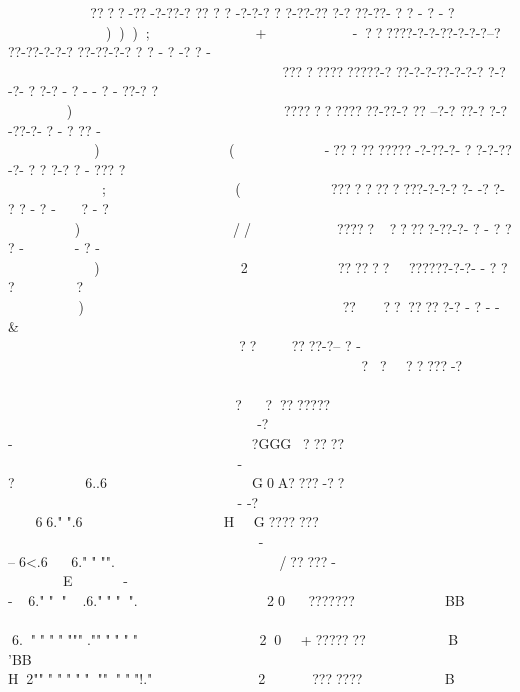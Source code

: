  ????-??-?-??-? ?? ? ? -?-?-? ? ?-??-?? ?-? ??-??-  ?   ? - ? - ?    )));  + -??????-?-?-??-?-?-?--? ??-??-?-?-? ??-??-?-?   ?  ? - ? -? ? -              ?????????????-? ??-?-?-??-?-?-? ?-?-?- ? ?-?  - ? - - ?  -  ??-? ?     )      ????????????-??-? ?? --?-? ??-? ?-?-??-?-  ?        -    ?  ??   -    )     ( -??????????-?-??-?- ? ?-?-??-?- ? ? ?-? ?               -  ??? ?     ;  ( ???????????-?-?-? ?- -? ?- ? ?  -  ?  -               ? - ?      )   // ??????????-??-?- ?  - ?    ?  ?  -              - ? -    )   2 ????????????-?-?- - ?  ? ?                   ?      )    ?????????-? -   ?  -    -   &                    ??????-?-- ? -                        ???????-?                           ?????????             -?-      ?GGG?????              - ?     6..6   G0A????-??           - -?    6         6."".6  HG???????         - --        6<.66."""".  /?????-E        - - 6.""".6."""".   20 ???????BB         6.""""""".""""""    20+ ???????B	'BB    H2 """"""""""""!."      2 ???????B%
